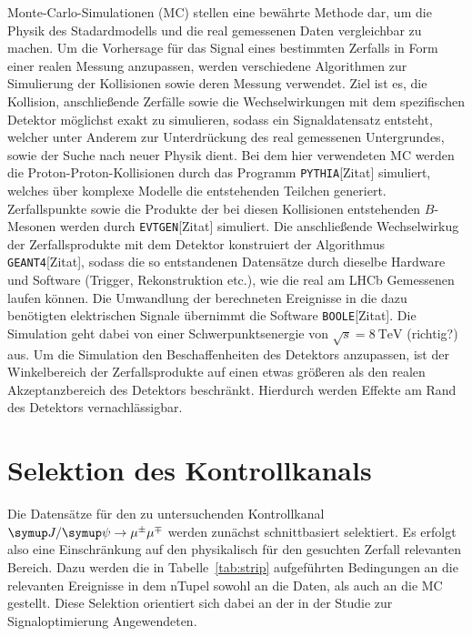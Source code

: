 Monte-Carlo-Simulationen (MC) stellen eine bewährte Methode dar, um die Physik des Stadardmodells und die real gemessenen Daten vergleichbar zu machen. Um die Vorhersage für das Signal eines bestimmten Zerfalls in Form einer realen Messung anzupassen, werden verschiedene Algorithmen zur Simulierung der Kollisionen sowie deren Messung verwendet. Ziel ist es, die Kollision, anschließende Zerfälle sowie die Wechselwirkungen mit dem spezifischen Detektor möglichst exakt zu simulieren, sodass ein Signaldatensatz entsteht, welcher unter Anderem zur Unterdrückung des real gemessenen Untergrundes, sowie der Suche nach neuer Physik dient. Bei dem hier verwendeten MC werden die Proton-Proton-Kollisionen durch das Programm \texttt{PYTHIA}[Zitat] simuliert, welches über komplexe Modelle die entstehenden Teilchen generiert. Zerfallspunkte sowie die Produkte der bei diesen Kollisionen entstehenden $B$-Mesonen werden durch \texttt{EVTGEN}[Zitat] simuliert. Die anschließende Wechselwirkug der Zerfallsprodukte mit dem Detektor konstruiert der Algorithmus \texttt{GEANT4}[Zitat], sodass die so entstandenen Datensätze durch dieselbe Hardware und Software (Trigger, Rekonstruktion etc.), wie die real am LHCb Gemessenen laufen können. Die Umwandlung der berechneten Ereignisse in die dazu benötigten elektrischen Signale übernimmt die Software \texttt{BOOLE}[Zitat]. Die Simulation geht dabei von einer Schwerpunktsenergie von $\sqrt{s}=\SI{8}{\tera\electronvolt}$ (richtig?) aus. Um die Simulation den Beschaffenheiten des Detektors anzupassen, ist der Winkelbereich der Zerfallsprodukte auf einen etwas größeren als den realen Akzeptanzbereich des Detektors beschränkt. Hierdurch werden Effekte am Rand des Detektors vernachlässigbar.

\section{Selektion des Kontrollkanals}
%
Die Datensätze für den zu untersuchenden Kontrollkanal $\kontroll$ werden zunächst schnittbasiert selektiert. Es erfolgt also eine Einschränkung auf den physikalisch für den gesuchten Zerfall relevanten Bereich. Dazu werden die in Tabelle~\ref{tab:strip} aufgeführten Bedingungen an die relevanten Ereignisse in dem nTupel sowohl an die Daten, als auch an die MC gestellt. Diese Selektion orientiert sich dabei an der in der Studie zur Signaloptimierung \cite{ba-maik} Angewendeten.

